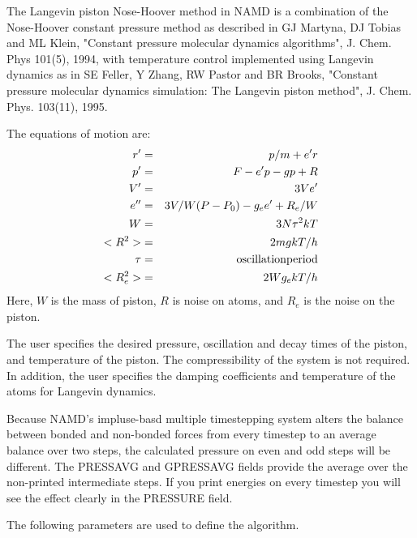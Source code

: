 The Langevin piston Nose-Hoover method in NAMD is a combination of the
Nose-Hoover constant pressure method as described in 
GJ Martyna, DJ Tobias and ML Klein, "Constant pressure molecular dynamics
algorithms", J. Chem. Phys 101(5), 1994,
with temperature control implemented using Langevin dynamics as in
SE Feller, Y Zhang, RW Pastor and BR Brooks, "Constant pressure molecular
dynamics simulation: The Langevin piston method", J. Chem. Phys. 103(11),
1995.

The equations of motion are:
\begin{eqnarray*}
       r' &=& p/m + e' r  \\
       p' &=& F - e' p - g p + R \\
       V' &=& 3 V e' \\
       e'' &=& 3V/W (P - P_0) - g_e e' + R_e/W  \\
       W &=&  3 N \tau^2 k T  \\
       <R^2> &=& 2 m g k T / h \\
       \tau &=& {\rm oscillation period} \\
       <R_e^2> &=& 2 W g_e k T / h
\end{eqnarray*}
Here, $W$ is the mass of piston, $R$ is noise on atoms, and $R_e$ is
the noise on the piston.

The user specifies the desired pressure, oscillation and decay times
of the piston, and temperature of the piston.  The compressibility of  
the system is not required.  In addition, the user specifies the
damping coefficients and temperature of the atoms for Langevin dynamics.

Because NAMD's impluse-basd multiple timestepping system alters the
balance between bonded and non-bonded forces from every timestep to an
average balance over two steps, the calculated pressure on even and odd
steps will be different.  The PRESSAVG and GPRESSAVG fields provide the
average over the non-printed intermediate steps.  If you print energies on
every timestep you will see the effect clearly in the PRESSURE field.

The following parameters are used to define the algorithm.  

